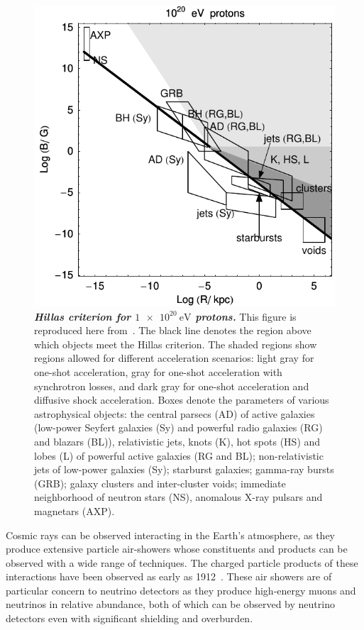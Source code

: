 \begin{figure}
	\centering
	\includegraphics[width=0.5\linewidth]{figures/HillasCriterionProton20}
	\internallinenumbers
	\caption{\textbf{\textit{Hillas criterion for $\SI{1e20}\eV$ protons.}}
		This figure is reproduced here from~\cite{Ptitsyna:2008zs}.
		The black line denotes the region above which objects meet the Hillas criterion.
		The shaded regions show regions allowed for different acceleration scenarios: light gray for one-shot acceleration, gray for one-shot acceleration with synchrotron losses, and dark gray for one-shot acceleration and diffusive shock acceleration.
		Boxes denote the parameters of various astrophysical objects: the central
		parsecs (AD) of active galaxies (low-power Seyfert galaxies (Sy) and powerful radio galaxies (RG) and blazars (BL)), relativistic jets, knots (K), hot spots (HS) and lobes (L) of powerful active galaxies (RG and BL); non-relativistic jets of low-power galaxies (Sy); starburst	galaxies; gamma-ray bursts (GRB); galaxy clusters and inter-cluster voids; immediate
		neighborhood of neutron stars (NS), anomalous X-ray pulsars and magnetars (AXP).
	}\label{fig:hillasp20}
\end{figure}

Cosmic rays can be observed interacting in the Earth's atmosphere, as they produce extensive particle air-showers whose constituents and products can be observed with a wide range of techniques.
The charged particle products of these interactions have been observed as early as 1912~\cite{hess1912uber}.
These air showers are of particular concern to neutrino detectors as they produce high-energy muons and neutrinos in relative abundance, both of which can be observed by neutrino detectors even with significant shielding and overburden.

